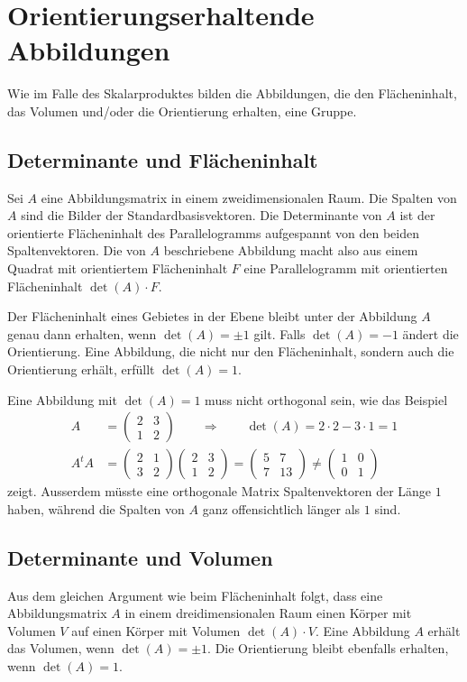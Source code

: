 %
%
% 
\section{Orientierungserhaltende Abbildungen}
Wie im Falle des Skalarproduktes bilden die Abbildungen, die den Flächeninhalt,
das Volumen und/oder die Orientierung erhalten, eine Gruppe.

\subsection{Determinante und Flächeninhalt}
Sei $A$ eine Abbildungsmatrix in einem zweidimensionalen Raum.
Die Spalten von $A$ sind die Bilder der Standardbasisvektoren.
Die Determinante von $A$ ist der orientierte Flächeninhalt des Parallelogramms 
aufgespannt von den beiden Spaltenvektoren.
Die von $A$ beschriebene Abbildung macht also aus einem Quadrat mit
orientiertem Flächeninhalt $F$
eine Parallelogramm mit orientierten Flächeninhalt $\det(A)\cdot F$.

Der Flächeninhalt eines Gebietes in der Ebene bleibt unter der Abbildung
$A$ genau dann erhalten, wenn $\det(A)=\pm 1$ gilt.
Falls $\det(A)=-1$ ändert die Orientierung.
Eine Abbildung, die nicht nur den Flächeninhalt, sondern auch die
Orientierung erhält, erfüllt $\det(A)=1$.

Eine Abbildung mit $\det(A)=1$ muss nicht orthogonal sein, wie das Beispiel
\begin{align*}
A
&=
\begin{pmatrix}2&3\\1&2\end{pmatrix}
\qquad\Rightarrow\qquad
\det(A) = 2\cdot 2-3\cdot 1 =1
\\
A^tA
&=
\begin{pmatrix}2&1\\3&2\end{pmatrix}
\begin{pmatrix}2&3\\1&2\end{pmatrix}
=
\begin{pmatrix}
5&7\\
7&13
\end{pmatrix}
\ne
\begin{pmatrix}
1&0\\
0&1
\end{pmatrix}
\end{align*}
zeigt.
Ausserdem müsste eine orthogonale Matrix Spaltenvektoren der Länge $1$ haben,
während die Spalten von $A$ ganz offensichtlich länger als $1$ sind.

\subsection{Determinante und Volumen}
Aus dem gleichen Argument wie beim Flächeninhalt folgt, dass eine
Abbildungsmatrix $A$ in einem dreidimensionalen Raum einen Körper mit
Volumen $V$ auf einen Körper mit Volumen $\det(A)\cdot V$.
Eine Abbildung $A$ erhält das Volumen, wenn $\det(A)=\pm 1$.
Die Orientierung bleibt ebenfalls erhalten, wenn $\det(A)=1$.

